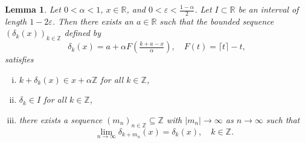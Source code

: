\documentclass[reqno,a4paper,12pt]{amsart}
\numberwithin{equation}{section}
\newtheorem{lemma}[definition]{Lemma}
\def\Z{{\mathbb Z}}
\def\R{{\mathbb R}}
\newcommand\1{\mathds{1}}
\begin{document}
\begin{lemma}\label{lem:good_delta_exists}
    Let $0<\alpha<1$, $x \in \R$, and $0<\varepsilon<\frac{1-\alpha}{2}$. Let $I \subset \R $ be an interval of length $1-2\varepsilon$. Then there exists an $a \in \R $ such that the bounded sequence $(\delta_k(x))_{k \in \Z}$ defined by
    $$
    \delta_k(x) = a+\alpha F\left(\tfrac{k+a-x}{\alpha}\right), \quad F(t)=\lceil t\rceil-t,
    $$
    satisfies
    \begin{enumerate}[(i)]
        \item $k+\delta_k(x)\in x+\alpha\Z$ for all $k\in\Z$,\item $\delta_k \in I$ for all $k \in \Z$,
        \item there exists a sequence  $(m_n)_{n\in\Z} \subseteq \Z$ with $|m_n|\to\infty$ as $n\to\infty$ such that 
        \begin{equation}
        \lim\limits_{n\to\infty} \delta_{k+m_n}(x)=\delta_k(x),\quad k\in\Z.
    \end{equation}
    \end{enumerate}
\end{lemma}
\end{document}
